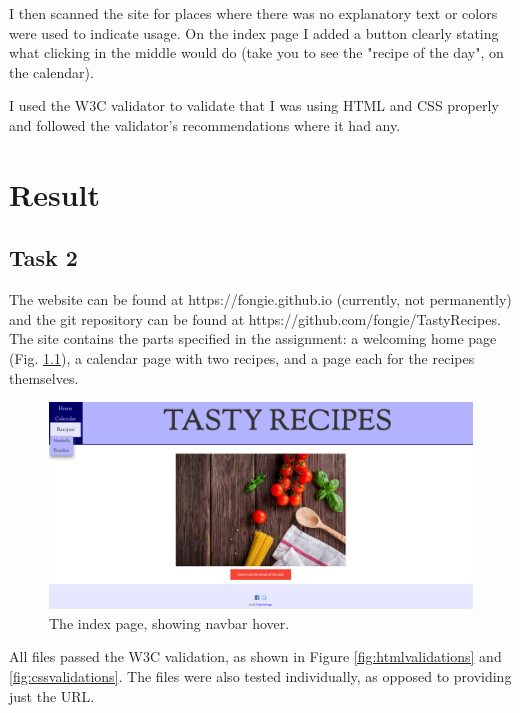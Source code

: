 \documentclass[a4paper]{scrreprt}
\begin{document}
I then scanned the site for places where there was no explanatory text or colors were used to indicate usage. On the index page I added a button clearly stating what clicking in the middle would do (take you to see the "recipe of the day", on the calendar).

I used the W3C validator to validate that I was using HTML and CSS properly and followed the validator's recommendations where it had any.


\chapter{Result}
\label{sec:result}

\section{Task 2}

The website can be found at https://fongie.github.io (currently, not permanently) and the git repository can be found at https://github.com/fongie/TastyRecipes.
The site contains the parts specified in the assignment: a welcoming home page (Fig. \ref{fig:design}), a calendar page with two recipes, and a page each for the recipes themselves.

\begin{figure}[h!]
  \begin{center}
    \includegraphics[scale=0.41]{design.png}
    \caption{The index page, showing navbar hover.}
    \label{fig:design}
  \end{center}
\end{figure}

All files passed the W3C validation, as shown in Figure \ref{fig:htmlvalidations} and \ref{fig:cssvalidations}. The files were also tested individually, as opposed to providing just the URL.
\end{document}
